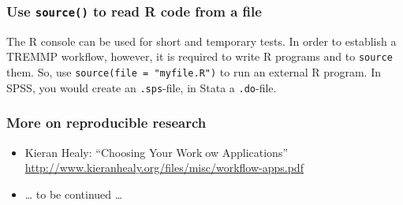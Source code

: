 \documentclass[bigger]{beamer}
\begin{document}
\begin{frame}
\frametitle{Use \texttt{source()} to read R code from a file}
\label{sec-6-1-4}

    The R console can be used for short and temporary tests. In order to
    establish a TREMMP workflow, however, it is required to write R programs and
    to \texttt{source} them. So, use \texttt{source(file = "myfile.R")} to run an external R
    program. In SPSS, you would create an \texttt{.sps}-file, in Stata a \texttt{.do}-file.
\end{frame}
\begin{frame}
\frametitle{More on reproducible research}
\label{sec-6-1-5}

\begin{itemize}
\item Kieran Healy: \enquote{Choosing Your Work􀃸ow Applications}  \href{http://www.kieranhealy.org/files/misc/workflow-apps.pdf}{http://www.kieranhealy.org/files/misc/workflow-apps.pdf}
\item \ldots{} to be continued \ldots{}
\end{itemize}
\end{frame}
\end{document}
